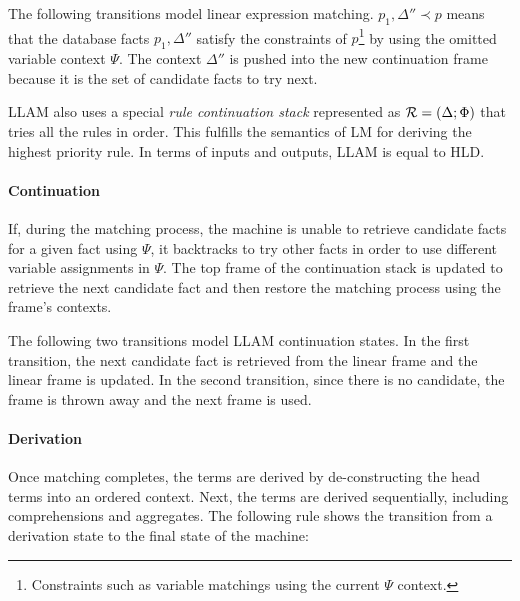 The following transitions model linear expression matching. $p_1, \Delta'' \prec
p$ means that the database facts $p_1, \Delta''$ satisfy the constraints of
$p$\footnote{Constraints such as variable matchings using the current $\Psi$
context.} by using the omitted variable context $\Psi$. The context $\Delta''$
is pushed into the new continuation frame because it is the set of candidate
facts to try next.

\vspace{-5mm}

\vspace{-5mm}

LLAM also uses a special \emph{rule continuation stack} represented as $\mathcal{R}
= (\Delta; \Phi)$ that tries all the rules in order. This fulfills the semantics
of LM for deriving the highest priority rule. In terms of inputs and outputs,
LLAM is equal to HLD.

\paragraph{Continuation} If, during the matching process, the machine is unable
to retrieve candidate facts for a given fact using $\Psi$, it backtracks to try
other facts in order to use different variable assignments in $\Psi$. The top
frame of the continuation stack is updated to retrieve the next candidate fact
and then restore the matching process using the frame's contexts.

The following two transitions model LLAM continuation states. In the first
transition, the next candidate fact is retrieved from the linear frame and the
linear frame is updated. In the second transition, since there is no candidate,
the frame is thrown away and the next frame is used.

\vspace{-5mm}

\vspace{-5mm}

\paragraph{Derivation}

Once matching completes, the terms are derived by de-constructing the head terms
into an ordered context. Next, the terms are derived sequentially, including
comprehensions and aggregates. The following rule shows the transition from a
derivation state to the final state of the machine:

\vspace{-5mm}

\vspace{-5mm}

